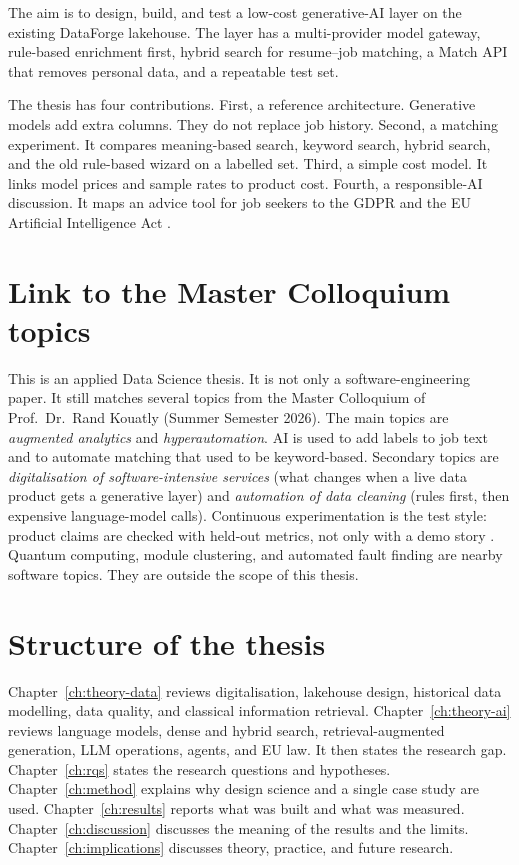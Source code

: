 The aim is to design, build, and test a low-cost generative-AI layer on the existing DataForge lakehouse. The layer has a multi-provider model gateway, rule-based enrichment first, hybrid search for resume--job matching, a Match API that removes personal data, and a repeatable test set.

The thesis has four contributions. First, a reference architecture. Generative models add extra columns. They do not replace job history. Second, a matching experiment. It compares meaning-based search, keyword search, hybrid search, and the old rule-based wizard on a labelled set. Third, a simple cost model. It links model prices and sample rates to product cost. Fourth, a responsible-AI discussion. It maps an advice tool for job seekers to the GDPR and the EU Artificial Intelligence Act .

\section{Link to the Master Colloquium topics}
\label{sec:alignment}

This is an applied Data Science thesis. It is not only a software-engineering paper. It still matches several topics from the Master Colloquium of Prof.\ Dr.\ Rand Kouatly (Summer Semester 2026). The main topics are \emph{augmented analytics} and \emph{hyperautomation}. AI is used to add labels to job text and to automate matching that used to be keyword-based. Secondary topics are \emph{digitalisation of software-intensive services} (what changes when a live data product gets a generative layer) and \emph{automation of data cleaning} (rules first, then expensive language-model calls). Continuous experimentation is the test style: product claims are checked with held-out metrics, not only with a demo story . Quantum computing, module clustering, and automated fault finding are nearby software topics. They are outside the scope of this thesis.

\section{Structure of the thesis}
\label{sec:structure}

Chapter~\ref{ch:theory-data} reviews digitalisation, lakehouse design, historical data modelling, data quality, and classical information retrieval. Chapter~\ref{ch:theory-ai} reviews language models, dense and hybrid search, retrieval-augmented generation, LLM operations, agents, and EU law. It then states the research gap. Chapter~\ref{ch:rqs} states the research questions and hypotheses. Chapter~\ref{ch:method} explains why design science and a single case study are used. Chapter~\ref{ch:results} reports what was built and what was measured. Chapter~\ref{ch:discussion} discusses the meaning of the results and the limits. Chapter~\ref{ch:implications} discusses theory, practice, and future research.


